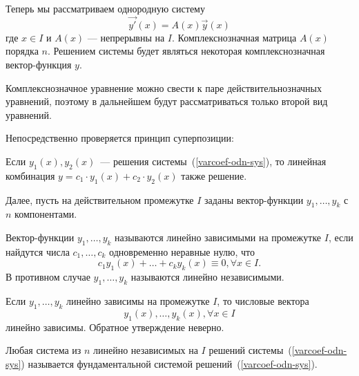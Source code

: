 Теперь мы рассматриваем однородную систему
\begin{equation}\label{varcoef-odn-sys}
    \vec{y'}(x) = A(x)\vec{y}(x)
\end{equation}
где \(x \in I\) и \(A(x)\)  --- непрерывны на $I$. Комплекснозначная матрица \(A(x)\) порядка $n$. Решением системы будет являться некоторая комплекснозначная вектор-функция $y$.

Комплекснозначное уравнение можно свести к паре действительнозначных уравнений, поэтому в дальнейшем будут рассматриваться только второй вид уравнений.

Непосредственно проверяется принцип суперпозиции: 
\begin{lemma}
Если $y_1(x), y_2(x)$~--- решения системы~(\ref{varcoef-odn-sys}), то линейная комбинация $y = c_1 \cdot y_1(x) + c_2 \cdot y_2(x)$ также решение.
\end{lemma}

Далее, пусть на действительном промежутке $I$ заданы вектор-функции \(y_1, \ldots, y_k\) с $n$ компонентами.

\begin{definition}
Вектор-функции \(y_1, \ldots, y_k\) называются линейно зависимыми на промежутке $I$, если найдутся числа \(c_1, \ldots, c_k\) одновременно неравные нулю, что
\[
c_1 y_1(x) + \ldots + c_k y_k(x) \equiv 0, \forall x \in I.
\]
В противном случае \(y_1, \ldots, y_k\) называются линейно независимыми.
\end{definition}

\begin{lemma}\label{varcoef-dependencylemma}
Если \(y_1, \ldots, y_k\) линейно зависимы на промежутке $I$, то числовые вектора
\[y_1(x), \ldots, y_k(x), \forall x \in I\] линейно зависимы. Обратное утверждение неверно.
\end{lemma}

\begin{definition}
Любая система из $n$ линейно независимых на $I$ решений системы~(\ref{varcoef-odn-sys}) называется фундаментальной системой решений~(\ref{varcoef-odn-sys}).
\end{definition}

